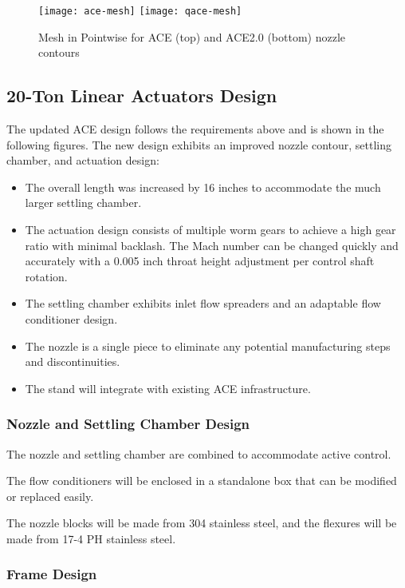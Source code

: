 \begin{figure}[ht!]
    \centering
    \texttt{[image: ace-mesh]}
    \texttt{[image: qace-mesh]}
    \caption{Mesh in Pointwise for ACE (top) and ACE2.0 (bottom) nozzle contours}
    \label{fig:mesh}
\end{figure}

\subsection{20-Ton Linear Actuators Design}

The updated ACE design follows the requirements above and is shown in the following figures. The new design exhibits an improved nozzle contour, settling chamber, and actuation design:
\begin{itemize}
    \item The overall length was increased by 16 inches to accommodate the much larger settling chamber.
    \item The actuation design consists of multiple worm gears to achieve a high gear ratio with minimal backlash. The Mach number can be changed quickly and accurately with a 0.005 inch throat height adjustment per control shaft rotation.
    \item The settling chamber exhibits inlet flow spreaders and an adaptable flow conditioner design.
    \item The nozzle is a single piece to eliminate any potential manufacturing steps and discontinuities.
    \item The stand will integrate with existing ACE infrastructure.
\end{itemize}

\subsubsection{Nozzle and Settling Chamber Design}

The nozzle and settling chamber are combined to accommodate active control.

The flow conditioners will be enclosed in a standalone box that can be modified or replaced easily.

The nozzle blocks will be made from 304 stainless steel, and the flexures will be made from 17-4 PH stainless steel.

\subsubsection{Frame Design}

